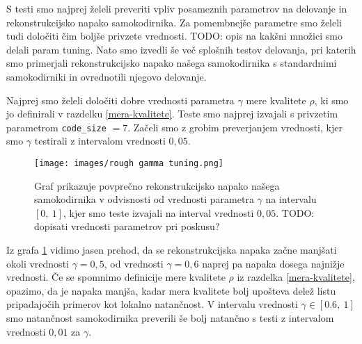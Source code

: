 \documentclass[12pt,a4paper,twoside]{article}
\theoremstyle{definition} %
\theoremstyle{plain} %
\numberwithin{equation}{section}  %
\begin{document}


S testi smo najprej želeli preveriti vpliv posameznih parametrov na delovanje in rekonstrukcijsko napako samokodirnika.
Za pomembnejše parametre smo želeli tudi določiti čim boljše privzete vrednosti.
TODO: opis na kakšni množici smo delali param tuning.
Nato smo izvedli še več splošnih testov delovanja, pri katerih smo primerjali rekonstrukcijsko napako našega samokodirnika s standardnimi samokodirniki in ovrednotili njegovo delovanje.





Najprej smo želeli določiti dobre vrednosti parametra $\gamma$ mere kvalitete $\rho$, ki smo jo definirali v razdelku \ref{mera-kvalitete}.
Teste smo najprej izvajali s privzetim parametrom \texttt{code\_size} $= 7$. %
Začeli smo z grobim preverjanjem vrednosti, kjer smo $\gamma$ testirali z intervalom vrednosti $0,05$.

\begin{figure}[h]
	\centering
	\texttt{[image: images/rough gamma tuning.png]}
	\caption[Pregled rekonstrukcijske napake glede na $\gamma$.]{Graf prikazuje povprečno rekonstrukcijsko napako našega 
	samokodirnika v odvisnosti od vrednosti parametra $\gamma$ na intervalu $[0,\ 1]$, kjer smo teste izvajali na interval vrednosti $0,05$. 
	TODO: dopisati vrednosti parametrov pri poskusu?}
	\label{fig:gamma_rough}
\end{figure}

Iz grafa \ref{fig:gamma_rough} vidimo jasen prehod, da se rekonstrukcijska napaka začne manjšati okoli vrednosti $\gamma=0,5$, 
od vrednosti $\gamma=0,6$ naprej pa napaka dosega najnižje vrednosti.
Če se spomnimo definicije mere kvalitete $\rho$ iz razdelka \ref{mera-kvalitete}, opazimo, da je napaka manjša, 
kadar mera kvalitete bolj upošteva delež listu pripadajočih primerov kot lokalno natančnost.
V intervalu vrednosti $\gamma \in [0.6,\ 1]$ smo natančnost samokodirnika preverili še bolj natančno s testi z intervalom vrednosti $0,01$ za $\gamma$.
\end{document}
